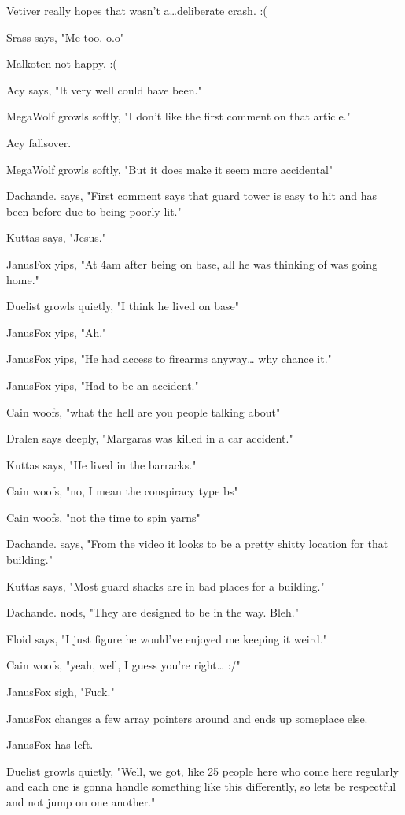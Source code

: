 Vetiver really hopes that wasn't a\ldots{}deliberate crash. :(

Srass says, "Me too. o.o"

Malkoten not happy. :(

Acy says, "It very well could have been."

MegaWolf growls softly, "I don't like the first comment on that article."

Acy fallsover.

MegaWolf growls softly, "But it does make it seem more accidental"

Dachande. says, "First comment says that guard tower is easy to hit and has been before due to being poorly lit."

Kuttas says, "Jesus."

JanusFox yips, "At 4am after being on base, all he was thinking of was going home."

Duelist growls quietly, "I think he lived on base"

JanusFox yips, "Ah."

JanusFox yips, "He had access to firearms anyway\ldots{} why chance it."

JanusFox yips, "Had to be an accident."

Cain woofs, "what the hell are you people talking about"

Dralen says deeply, "Margaras was killed in a car accident."

Kuttas says, "He lived in the barracks."

Cain woofs, "no, I mean the conspiracy type bs"

Cain woofs, "not the time to spin yarns"

Dachande. says, "From the video it looks to be a pretty shitty location for that building."

Kuttas says, "Most guard shacks are in bad places for a building."

Dachande. nods, "They are designed to be in the way. Bleh."

Floid says, "I just figure he would've enjoyed me keeping it weird."

Cain woofs, "yeah, well, I guess you're right\ldots{} :/"

JanusFox sigh, "Fuck."

JanusFox changes a few array pointers around and ends up someplace else.

JanusFox has left.

Duelist growls quietly, "Well, we got, like 25 people here who come here regularly and each one is gonna handle something like this differently, so lets be respectful and not jump on one another."


